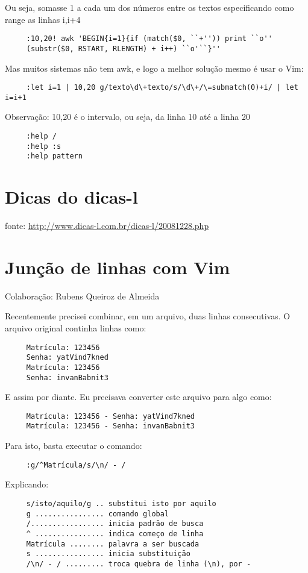 Ou seja, somasse 1 a cada um dos números entre os textos
especificando como range as linhas i,i+4

\begin{verbatim}
     :10,20! awk 'BEGIN{i=1}{if (match($0, ``+'')) print ``o''
     (substr($0, RSTART, RLENGTH) + i++) ``o'``}''
\end{verbatim}

Mas muitos sistemas não tem awk, e logo a melhor solução mesmo é usar o Vim:

\begin{verbatim}
     :let i=1 | 10,20 g/texto\d\+texto/s/\d\+/\=submatch(0)+i/ | let i=i+1
\end{verbatim}

Observação: 10,20 é o intervalo, ou seja, da linha 10 até a linha 20

\begin{verbatim}
     :help /
     :help :s
     :help pattern
\end{verbatim}

\section{Dicas do dicas-l}

fonte: \url{http://www.dicas-l.com.br/dicas-l/20081228.php}

\section{Junção de linhas com Vim}
\label{Junção de linhas com Vim}
Colaboração: Rubens Queiroz de Almeida

Recentemente precisei combinar, em um arquivo, duas linhas
consecutivas. O arquivo original continha linhas como:

\begin{verbatim}
     Matrícula: 123456
     Senha: yatVind7kned
     Matrícula: 123456
     Senha: invanBabnit3
\end{verbatim}

E assim por diante. Eu precisava converter este arquivo para algo como:

\begin{verbatim}
     Matrícula: 123456 - Senha: yatVind7kned
     Matrícula: 123456 - Senha: invanBabnit3
\end{verbatim}

Para isto, basta executar o comando:

\begin{verbatim}
     :g/^Matrícula/s/\n/ - /
\end{verbatim}

Explicando:

\begin{verbatim}
     s/isto/aquilo/g .. substitui isto por aquilo
     g ................ comando global
     /................. inicia padrão de busca
     ^ ................ indica começo de linha
     Matrícula ........ palavra a ser buscada
     s ................ inicia substituição
     /\n/ - / ......... troca quebra de linha (\n), por -
\end{verbatim}

